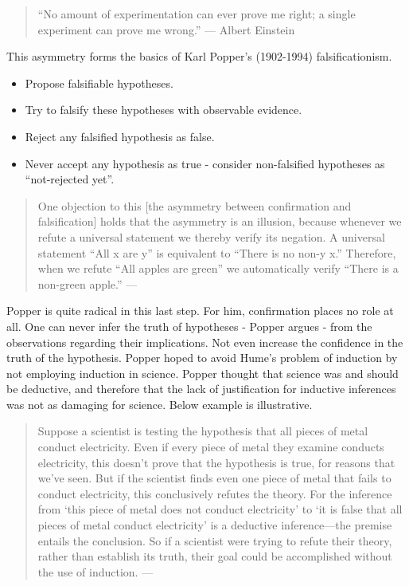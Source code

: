 \documentclass[
]{book}
\providecommand{\tightlist}{%
  \setlength{\itemsep}{0pt}\setlength{\parskip}{0pt}}
\begin{document}
\begin{quote}
``No amount of experimentation can ever prove me right; a single experiment can prove me wrong.'' --- Albert Einstein
\end{quote}

This asymmetry forms the basics of Karl Popper's (1902-1994) falsificationism.

\begin{itemize}
\tightlist
\item
  Propose falsifiable hypotheses.
\item
  Try to falsify these hypotheses with observable evidence.
\item
  Reject any falsified hypothesis as false.
\item
  Never accept any hypothesis as true - consider non-falsified hypotheses as ``not-rejected yet''.
\end{itemize}

\begin{quote}
One objection to this {[}the asymmetry between confirmation and falsification{]} holds that the asymmetry is an illusion, because whenever we refute a universal statement we thereby verify its negation. A universal statement ``All x are y'' is equivalent to ``There is no non-y x.'' Therefore, when we refute ``All apples are green'' we automatically verify ``There is a non-green apple.'' --- \citep{percival2015confirmation}
\end{quote}

Popper is quite radical in this last step. For him, confirmation places no role at all. One can never infer the truth of hypotheses - Popper argues - from the observations regarding their implications. Not even increase the confidence in the truth of the hypothesis. Popper hoped to avoid Hume's problem of induction by not employing induction in science. Popper thought that science was and should be deductive, and therefore that the lack of justification for inductive inferences was not as damaging for science. Below example is illustrative.

\begin{quote}
Suppose a scientist is testing the hypothesis that all pieces of metal conduct electricity. Even if every piece of metal they examine conducts electricity, this doesn't prove that the hypothesis is true, for reasons that we've seen. But if the scientist finds even one piece of metal that fails to conduct electricity, this conclusively refutes the theory. For the inference from `this piece of metal does not conduct electricity' to `it is false that all pieces of metal conduct electricity' is a deductive inference---the premise entails the conclusion. So if a scientist were trying to refute their theory, rather than establish its truth, their goal could be accomplished without the use of induction. --- \citep{okasha-pos}
\end{quote}
\end{document}
